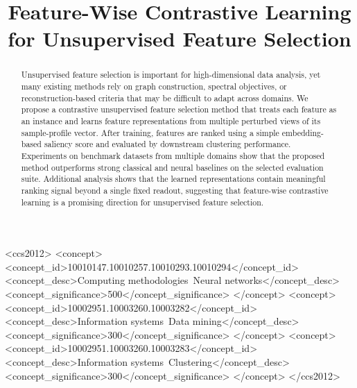 \documentclass[sigconf,natbib=true,anonymous=true]{acmart}
\begin{document}
\title{Feature-Wise Contrastive Learning for Unsupervised Feature Selection}

\begin{abstract}
Unsupervised feature selection is important for high-dimensional data analysis,
yet many existing methods rely on graph construction, spectral objectives, or
reconstruction-based criteria that may be difficult to adapt across domains. We
propose a contrastive unsupervised feature selection method that treats each
feature as an instance and learns feature representations from multiple
perturbed views of its sample-profile vector. After training, features are
ranked using a simple embedding-based saliency score and evaluated by downstream
clustering performance. Experiments on benchmark datasets from multiple domains
show that the proposed method outperforms strong classical and neural baselines
on the selected evaluation suite. Additional analysis shows that the learned
representations contain meaningful ranking signal beyond a single fixed readout,
suggesting that feature-wise contrastive learning is a promising direction for
unsupervised feature selection.
\end{abstract}

\begin{CCSXML}
<ccs2012>
 <concept>
  <concept_id>10010147.10010257.10010293.10010294</concept_id>
  <concept_desc>Computing methodologies~Neural networks</concept_desc>
  <concept_significance>500</concept_significance>
 </concept>
 <concept>
  <concept_id>10002951.10003260.10003282</concept_id>
  <concept_desc>Information systems~Data mining</concept_desc>
  <concept_significance>300</concept_significance>
 </concept>
 <concept>
  <concept_id>10002951.10003260.10003283</concept_id>
  <concept_desc>Information systems~Clustering</concept_desc>
  <concept_significance>300</concept_significance>
 </concept>
</ccs2012>
\end{CCSXML}



\maketitle
\end{document}
